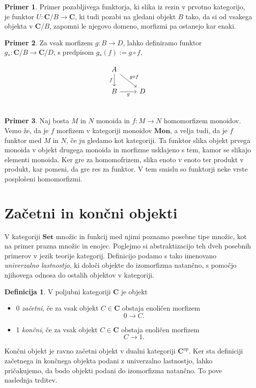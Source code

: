 \documentclass[12pt,a4paper]{book}
\theoremstyle{definition}
\newtheorem{definicija}{Definicija}[chapter]
\theoremstyle{plain}
\theoremstyle{definition}
\newtheorem{primer}{Primer}[section]
\theoremstyle{remark}
\newcommand{\cat}[1]{\textbf{#1}}
\begin{document}
\begin{primer}
Primer pozabljivega funktorja, ki slika iz rezin v prvotno kategorijo, je funktor $U : \cat{C}/B \to \cat{C}$, ki tudi pozabi na gledani objekt $B$ tako, da si od vsakega objekta v $\cat{C}/B$, zapomni le njegovo domeno, morfizmi pa ostanejo kar enaki.
\end{primer}

\begin{primer}
Za vsak morfizem $g : B \to D$, lahko definiramo funktor $g_* : \cat{C}/B \to \cat{C}/D$, s predpisom $g_*(f) := g \circ f$,

$$\begin{tikzcd}
A \ar[d, "f"'] \ar[dr, "g \circ f"] & \\
B \ar[r, "g"'] & D \\
\end{tikzcd}$$

\end{primer}

\begin{primer}
Naj bosta $M$ in $N$ monoida in $f : M \to N$ homomorfizem monoidov. Vemo že, da je $f$ morfizem v kategoriji monoidov $\cat{Mon}$, a velja tudi, da je $f$ funktor med $M$ in $N$, če ju gledamo kot kategoriji. Ta funktor slika objekt prvega monoida v objekt drugega monoida in morfizme usklajeno s tem, kamor se slikajo elementi monoida. Ker gre za homomofrizem, slika enoto v enoto ter produkt v produkt, kar pomeni, da gre res za funktor. V tem smislu so funktorji neke vrste posplošeni homomorfizmi.
\end{primer}


\section{Začetni in končni objekti}
V kategoriji $\cat{Set}$ množic in funkcij med njimi poznamo posebne tipe množic, kot na primer prazna množic in enojec. Poglejmo si abstraktizacijo teh dveh posebnih primerov v jezik teorije kategorij. Definicijo podamo s tako imenovano \emph{univerzalno lastnostjo}, ki določi objekte do izomorfizma natančno, s pomočjo njihovega odnosa do ostalih objektov v kategoriji.

\begin{definicija}
V poljubni kategoriji $\cat{C}$ je objekt
\begin{itemize}
\item 0 \emph{začetni}, če za vsak objekt $C \in \cat{C}$ obstaja enoličen morfizem $$0 \to C.$$
\item 1 \emph{končni}, če za vsak objekt $C \in \cat{C}$ obstaja enoličen morfizem $$C \to 1.$$
\end{itemize}
\end{definicija}
Končni objekt je ravno začetni objekt v dualni kategoriji $\cat{C}^{op}$. Ker sta definiciji začetnega in končnega objekta podani z univerzalno lastnostjo, lahko pričakujemo, da bodo objekti podani do izomorfizma natančno. To pove naslednja trditev.
\end{document}

